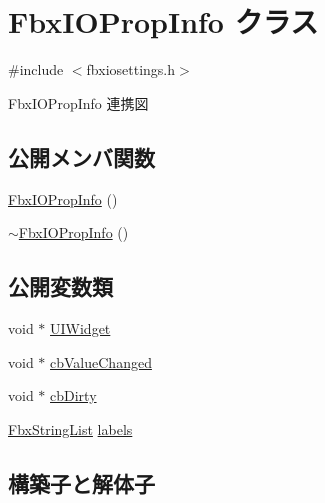 \hypertarget{class_fbx_i_o_prop_info}{}\section{Fbx\+I\+O\+Prop\+Info クラス}
\label{class_fbx_i_o_prop_info}


{\ttfamily \#include $<$fbxiosettings.\+h$>$}



Fbx\+I\+O\+Prop\+Info 連携図
\subsection*{公開メンバ関数}
\begin{DoxyCompactItemize}
\item 
\hyperlink{class_fbx_i_o_prop_info_a2e822ebff7eec7cd53055c1e333c9db3}{Fbx\+I\+O\+Prop\+Info} ()
\item 
\hyperlink{class_fbx_i_o_prop_info_a1cf2524e902186c660c765a5069a9660}{$\sim$\+Fbx\+I\+O\+Prop\+Info} ()
\end{DoxyCompactItemize}
\subsection*{公開変数類}
\begin{DoxyCompactItemize}
\item 
void $\ast$ \hyperlink{class_fbx_i_o_prop_info_a2ea012986e65addbf7ae8cb3db723b7c}{U\+I\+Widget}
\item 
void $\ast$ \hyperlink{class_fbx_i_o_prop_info_a721a79e80d25c2e5d904fa6e285df8b6}{cb\+Value\+Changed}
\item 
void $\ast$ \hyperlink{class_fbx_i_o_prop_info_ad1102a1aa9802f26a71df9aeb7033de7}{cb\+Dirty}
\item 
\hyperlink{class_fbx_string_list}{Fbx\+String\+List} \hyperlink{class_fbx_i_o_prop_info_adee0d1340eefab937fe4af63e8172c53}{labels}
\end{DoxyCompactItemize}


\subsection{構築子と解体子}
\mbox{\label{class_fbx_i_o_prop_info_a2e822ebff7eec7cd53055c1e333c9db3}} 
